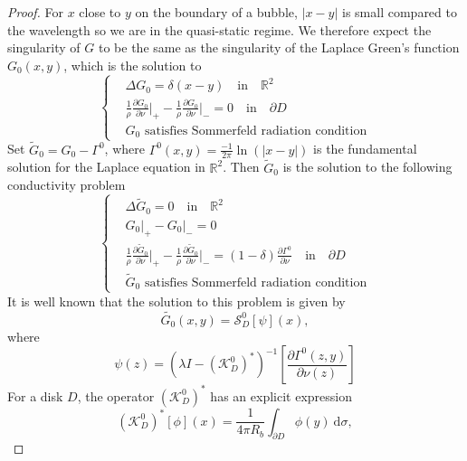 \documentclass[a4paper]{article}
\theoremstyle{definition}
\newcommand{\R}{\mathbb{R}}
\renewcommand{\S}{\mathcal{S}}
\newcommand{\K}{\mathcal{K}}
\newcommand{\dx}{\: \mathrm{d}}
\newcommand{\ds}{\displaystyle}
\begin{document}
\begin{proof}
For $x$ close to $y$ on the boundary of a bubble, $|x-y|$ is small compared to the wavelength so we are in the quasi-static regime. We therefore expect the singularity of $G$ to be the same as the singularity of the Laplace Green's function $G_0(x,y)$, which is the solution to 
\begin{equation*}
\left\{
\begin{array}{ll}
	&\ds \Delta G_0 = \delta(x-y) \quad \text{in}\quad \R^2 \\
	&\ds \frac{1}{\rho}\frac{\partial G_0}{\partial \nu}\bigg|_+ - \frac{1}{\rho}\frac{\partial G_0}{\partial \nu}\bigg|_- = 0 \quad \text{in} \quad \partial D \\
	&\ds G_0 \text{ satisfies Sommerfeld radiation condition} 
\end{array}
\right.	
\end{equation*}
Set $\tilde{G}_0 = G_0-\Gamma^0$, where $\Gamma^0(x,y)= \frac{-1}{2\pi}\ln(|x-y|)$ is the fundamental solution for the Laplace equation in $\R^2$. Then $\tilde{G}_0$ is the solution to the following conductivity problem
\begin{equation*}
\left\{
\begin{array}{ll}
&\ds \Delta \tilde{G}_0 = 0 \quad \text{in}\quad \R^2 \\
&\ds G_0\big|_+-G_0\big|_- = 0 \\
&\ds \frac{1}{\rho}\frac{\partial \tilde{G}_0}{\partial \nu}\bigg|_+ - \frac{1}{\rho}\frac{\partial \tilde{G}_0}{\partial \nu}\bigg|_- = (1-\delta)\frac{\partial \Gamma^0}{\partial \nu} \quad \text{in} \quad \partial D \\
&\ds \tilde{G}_0 \text{ satisfies Sommerfeld radiation condition} 
\end{array}
\right.	
\end{equation*}
It is well known that the solution to this problem is given by
\begin{equation*}
\tilde{G_0}(x,y) = \S_D^0 \left[\psi\right](x),
\end{equation*}
where
\begin{equation*}
\psi(z) = \left(\lambda I - \left( \K_D^0 \right)^*\right)^{-1} \left[ \frac{\partial\Gamma^0(z,y)}{\partial \nu(z)} \right] 
\end{equation*}
For a disk $D$, the operator $\left(\K_D^0\right)^*$ has an explicit expression
\begin{equation*}
\left(\K_D^0\right)^*[\phi](x) = \frac{1}{4\pi R_b}\int_{\partial D} \phi(y)\dx \sigma,

\end{equation*}
\end{proof}
\end{document}

